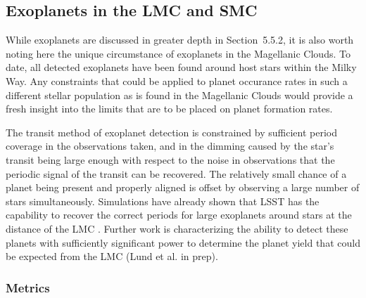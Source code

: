%
%

\subsection{Exoplanets in the LMC and SMC}
\def\secname{\chpname:MC_exoplanets}\label{sec:\secname}


While exoplanets are discussed in greater depth in Section~5.5.2, it is
also worth noting here the unique circumstance of exoplanets in the
Magellanic Clouds. To date, all detected exoplanets have been found around
host stars within the Milky Way. Any constraints that could be applied to
planet occurance rates in such a different stellar population as is found
in the Magellanic Clouds would provide a fresh insight into the limits
that are to be placed on planet formation rates.

The transit method of exoplanet detection is constrained by sufficient
period coverage in the observations taken, and in the dimming caused by
the star's transit being large enough with respect to the noise in
observations that the periodic signal of the transit can be recovered.
The relatively small chance of a planet being present and properly
aligned is offset by observing a large number of stars simultaneously.
Simulations have already shown that LSST has the capability to recover
the correct periods for large exoplanets around stars at the distance
of the LMC \citet{2015AJ....149...16L}. Further work is characterizing
the ability to detect these planets with sufficiently significant power
to determine the planet yield that could be expected from the LMC
(Lund et al. in prep).



\subsubsection{Metrics}
\label{sec:\chpname:metrics}

